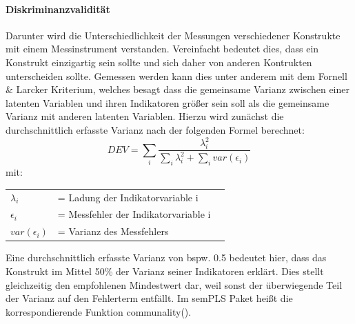 \documentclass{article}\usepackage[]{graphicx}\usepackage[]{color}
\begin{document}
\paragraph{Diskriminanzvalidität} 

Darunter wird die Unterschiedlichkeit der Messungen verschiedener Konstrukte mit einem Messinstrument verstanden. Vereinfacht bedeutet dies, dass ein Konstrukt einzigartig sein sollte und sich daher von anderen Kontrukten unterscheiden sollte. Gemessen werden kann dies unter anderem mit dem Fornell \& Larcker Kriterium\cite{fornell1981structural}, welches besagt dass die gemeinsame Varianz zwischen einer latenten Variablen und ihren Indikatoren größer sein soll als die gemeinsame Varianz mit anderen latenten Variablen. Hierzu wird zunächst die durchschnittlich erfasste Varianz nach der folgenden Formel berechnet:
\begin{equation}
DEV = \sum_{i}^{}\frac{\lambda_{i}^{2}}{\sum_{i}^{}\lambda_{i}^{2}+\sum_{i}^{}var(\epsilon_{i})}
\end{equation}
mit:\\
\begin{tabular}{lll}
$\lambda_{i}$  &= Ladung der Indikatorvariable i\\
$\epsilon_{i}$ &= Messfehler der Indikatorvariable i\\
$var(\epsilon_{i})$ &= Varianz des Messfehlers\\
\end{tabular}
Eine durchschnittlich erfasste Varianz von bspw. 0.5 bedeutet hier, dass das Konstrukt im Mittel 50\% der Varianz seiner Indikatoren erklärt. Dies stellt gleichzeitig den empfohlenen Mindestwert dar, weil sonst der überwiegende Teil der Varianz auf den Fehlerterm entfällt.\cite{homburg1996konzeptualisierung,rodgers2003developing}
Im semPLS Paket heißt die korrespondierende Funktion communality().
\end{document}
